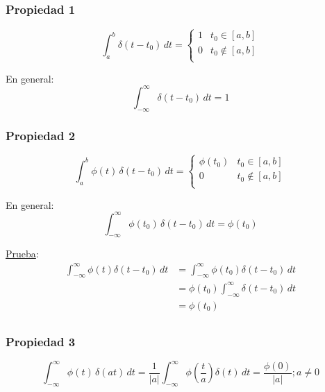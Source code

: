 \subsubsection*{Propiedad 1}
\begin{equation*}
    \int_a^b \delta(t-t_0)\,dt=\begin{cases}
        1 & t_0\in[a,b] \\
        0 & t_0\notin[a,b] \\
    \end{cases}
\end{equation*}

En general:
\begin{equation}
    \int_{-\infty}^{\infty}\delta(t-t_0)\,dt=1
\end{equation}

\subsubsection*{Propiedad 2}
\begin{equation*}
    \int_a^b \phi(t)\,\delta(t-t_0)\,dt=\begin{cases}
        \phi(t_0) & t_0\in[a,b] \\
        0 & t_0\notin[a,b] \\
    \end{cases}
\end{equation*}

En general:
\begin{equation}
    \int_{-\infty}^{\infty}\phi(t_0)\,\delta(t-t_0)\,dt=\phi(t_0)
\end{equation}

\underline{Prueba}:
\begin{equation*}
\begin{split}
    \int_{-\infty}^{\infty}\phi(t)\delta(t-t_0)\,dt
        &=\int_{-\infty}^{\infty}\phi(t_0)\delta(t-t_0)\,dt\\
        &=\phi(t_0)\int_{-\infty}^{\infty}\delta(t-t_0)\,dt\\
        &=\phi(t_0)\\
\end{split}
\end{equation*}

\subsubsection*{Propiedad 3}
\begin{equation}
    \int_{-\infty}^{\infty}\phi(t)\,\delta(at)\,dt
        =\frac{1}{|a|}\int_{-\infty}^{\infty}
            \phi\left(\frac{t}{a}\right)\delta(t)\,dt
        =\frac{\phi(0)}{|a|}; a\neq0
\end{equation}

